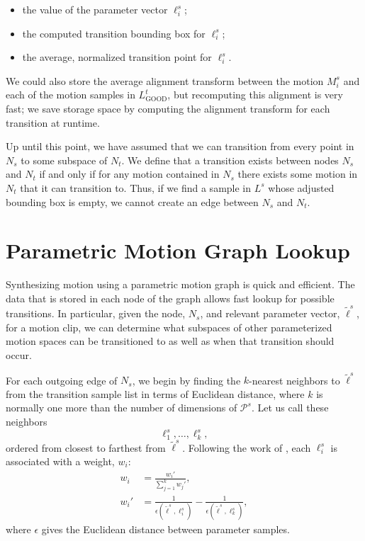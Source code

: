 \documentclass[10pt,twocolumn]{article}
\begin{document}
\begin{itemize}
\item the value of the parameter vector $\ell_i^s$;
\item the computed transition bounding box for $\ell_i^s$;
\item the average, normalized transition point for $\ell_i^s$.
\end{itemize}

We could also store the average alignment transform between the motion $M_i^s$ and each of the motion samples in $L_{\mathrm{GOOD}}^t$, but recomputing this alignment is very fast; we save storage space by computing the alignment transform for each transition at runtime.

Up until this point, we have assumed that we can transition from every point in $N_s$ to some subspace of $N_t$. We define that a transition exists between nodes $N_s$ and $N_t$ if and only if for any motion contained in $N_s$ there exists some motion in $N_t$ that it can transition to. Thus, if we find a sample in $L^s$ whose adjusted bounding box is empty, we cannot create an edge between $N_s$ and $N_t$.

\section{Parametric Motion Graph Lookup}
\label{sec:lookup}

Synthesizing motion using a parametric motion graph is quick and efficient. The data that is stored in each node of the graph allows fast lookup for possible transitions. In particular, given the node, $N_s$, and relevant parameter vector, $\tilde{\ell}^s$, for a motion clip, we can determine what subspaces of other parameterized motion spaces can be transitioned to as well as when that transition should occur.

For each outgoing edge of $N_s$, we begin by finding the $k$-nearest neighbors to $\tilde{\ell}^s$ from the transition sample list in terms of Euclidean distance, where $k$ is normally one more than the number of dimensions of $\mathcal{P}^s$. Let us call these neighbors
\[
\ell_1^s,\ldots,\ell_k^s,
\]
ordered from closest to farthest from $\tilde{\ell}^s$. Following the work of \citet{allen2002}, each $\ell_i^s$ is associated with a weight, $w_i$:
\begin{align}
w_i &=
\frac{w_i'}{\sum_{j=1}^{k} w_j'},
\label{eq:weight}\\
w_i' &=
\frac{1}{\epsilon(\tilde{\ell}^s,\ell_i^s)}
-
\frac{1}{\epsilon(\tilde{\ell}^s,\ell_k^s)},
\label{eq:weight-prime}
\end{align}
where $\epsilon$ gives the Euclidean distance between parameter samples.
\end{document}
